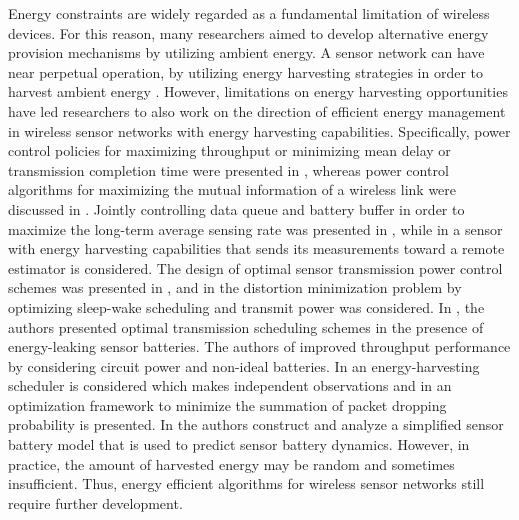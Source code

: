 \documentclass[twocolumn]{autart}    %
\begin{document}
Energy constraints are widely regarded as a fundamental limitation of wireless devices. 
For this reason, many researchers aimed to develop alternative energy provision mechanisms by utilizing ambient energy. 
A sensor network can have near perpetual operation, by utilizing energy harvesting strategies in order to harvest ambient energy \cite{2020:Ma_Lan_Hassan_Hu_Das}. 
However, limitations on energy harvesting opportunities have led researchers to also work on the direction of efficient energy management in wireless sensor networks with energy harvesting capabilities. 
Specifically, power control policies for maximizing throughput or minimizing mean delay or transmission completion time were presented in \cite{2010:Sharma_Mukherji_Joseph_Gupta, 2012:Tutuncuoglu_Yener}, whereas power control algorithms for maximizing the mutual information of a wireless link were discussed in \cite{2012:Ho_Zhang}. 
Jointly controlling data queue and battery buffer in order to maximize the long-term average sensing rate was presented in \cite{2012:Mao_Koksal_Shroff}, while in \cite{2013:Nayyar_Basar_Teneketzis_Veeravalli} a sensor with energy harvesting capabilities that sends its measurements toward a remote estimator is considered. 
The design of optimal sensor transmission power control schemes was presented in \cite{2017:Li_Zhang_Quevedo_Lau_Dey_Shi}, and in \cite{2017:Du_Yang_Shen_Kwak} the distortion minimization problem by optimizing sleep-wake scheduling and transmit power was considered. 
In \cite{2019:Knorn_Dey_Ahlen_Quevedo}, the authors presented optimal transmission scheduling schemes in the presence of energy-leaking sensor batteries. 
The authors of \cite{2019:Bhat_Motani_Lim} improved throughput performance by considering circuit power and non-ideal batteries.
In \cite{2020:Vasconcelos_Gagrani_Nayyar_Mitra} an energy-harvesting scheduler is considered which makes independent observations and in \cite{2020:Nobar_Mansourkiaie_Ahmed} an optimization framework to minimize the summation of packet dropping probability is presented.
In \cite{2021:Seifullaev_Knorn_Ahlen} the authors construct and analyze a simplified sensor battery model that is used to predict sensor battery dynamics. 
However, in practice, the amount of harvested energy may be random and sometimes insufficient. 
Thus, energy efficient algorithms for wireless sensor networks still require further development. 
\end{document}
